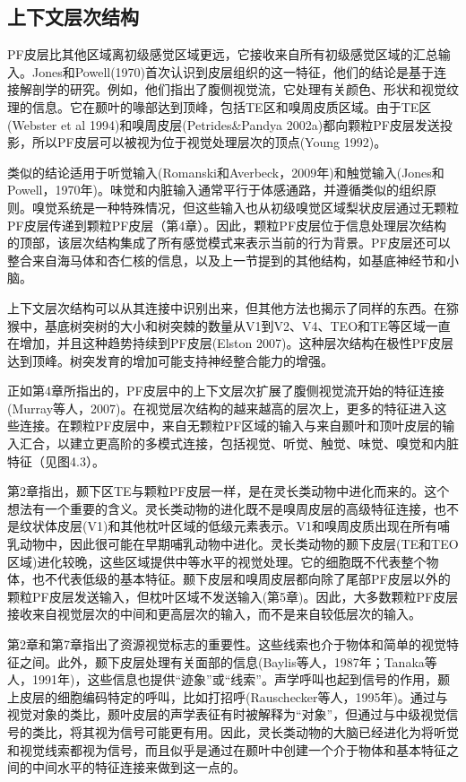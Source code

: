 \subsection{上下文层次结构}
\par
PF皮层比其他区域离初级感觉区域更远，它接收来自所有初级感觉区域的汇总输入。Jones和Powell(1970)首次认识到皮层组织的这一特征，他们的结论是基于连接解剖学的研究。例如，他们指出了腹侧视觉流，它处理有关颜色、形状和视觉纹理的信息。它在颞叶的喙部达到顶峰，包括TE区和嗅周皮质区域。由于TE区(Webster et al 1994)和嗅周皮层(Petrides\&Pandya 2002a)都向颗粒PF皮层发送投影，所以PF皮层可以被视为位于视觉处理层次的顶点(Young 1992)。
\par
类似的结论适用于听觉输入(Romanski和Averbeck，2009年)和触觉输入(Jones和Powell，1970年)。味觉和内脏输入通常平行于体感通路，并遵循类似的组织原则。嗅觉系统是一种特殊情况，但这些输入也从初级嗅觉区域梨状皮层通过无颗粒PF皮层传递到颗粒PF皮层（第4章）。因此，颗粒PF皮层位于信息处理层次结构的顶部，该层次结构集成了所有感觉模式来表示当前的行为背景。PF皮层还可以整合来自海马体和杏仁核的信息，以及上一节提到的其他结构，如基底神经节和小脑。
\par
上下文层次结构可以从其连接中识别出来，但其他方法也揭示了同样的东西。在猕猴中，基底树突树的大小和树突棘的数量从V1到V2、V4、TEO和TE等区域一直在增加，并且这种趋势持续到PF皮层(Elston 2007)。这种层次结构在极性PF皮层达到顶峰。树突发育的增加可能支持神经整合能力的增强。
\par
正如第4章所指出的，PF皮层中的上下文层次扩展了腹侧视觉流开始的特征连接(Murray等人，2007)。在视觉层次结构的越来越高的层次上，更多的特征进入这些连接。在颗粒PF皮层中，来自无颗粒PF区域的输入与来自颞叶和顶叶皮层的输入汇合，以建立更高阶的多模式连接，包括视觉、听觉、触觉、味觉、嗅觉和内脏特征（见图4.3）。
\par
第2章指出，颞下区TE与颗粒PF皮层一样，是在灵长类动物中进化而来的。这个想法有一个重要的含义。灵长类动物的进化既不是嗅周皮层的高级特征连接，也不是纹状体皮层(V1)和其他枕叶区域的低级元素表示。V1和嗅周皮质出现在所有哺乳动物中，因此很可能在早期哺乳动物中进化。灵长类动物的颞下皮层(TE和TEO区域)进化较晚，这些区域提供中等水平的视觉处理。它的细胞既不代表整个物体，也不代表低级的基本特征。颞下皮层和嗅周皮层都向除了尾部PF皮层以外的颗粒PF皮层发送输入，但枕叶区域不发送输入(第5章)。因此，大多数颗粒PF皮层接收来自视觉层次的中间和更高层次的输入，而不是来自较低层次的输入。
\par
第2章和第7章指出了资源视觉标志的重要性。这些线索也介于物体和简单的视觉特征之间。此外，颞下皮层处理有关面部的信息(Baylis等人，1987年；Tanaka等人，1991年)，这些信息也提供“迹象”或“线索”。声学呼叫也起到信号的作用，颞上皮层的细胞编码特定的呼叫，比如打招呼(Rauschecker等人，1995年)。通过与视觉对象的类比，颞叶皮层的声学表征有时被解释为“对象”，但通过与中级视觉信号的类比，将其视为信号可能更有用。因此，灵长类动物的大脑已经进化为将听觉和视觉线索都视为信号，而且似乎是通过在颞叶中创建一个介于物体和基本特征之间的中间水平的特征连接来做到这一点的。
